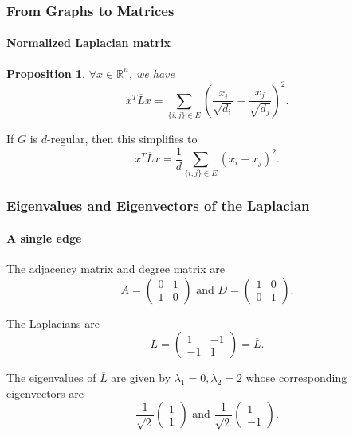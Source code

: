 \documentclass[aspectratio=43,leqno]{beamer}
\newtheorem{proposition}[theorem]{Proposition}
\begin{document}
\begin{frame}
  \frametitle{From Graphs to Matrices}
  \framesubtitle{Normalized Laplacian matrix}

\begin{proposition}
  $\forall x \in \mathbb{R}^n$, we have 
\begin{displaymath}
x^T \overline{L} x = \sum_{\{i,j\}\in E} \left( \frac{x_i}{\sqrt{d_i}} - \frac{x_j}{\sqrt{d_j}} \right)^2.
\end{displaymath} 
\end{proposition}
\pause

If $G$ is $d$-regular, then this simplifies to 
\begin{displaymath}
x^T\overline{L}x = \frac{1}{d} \sum_{\{i,j\}\in E} (x_i-x_j)^2.
\end{displaymath}

\end{frame}

\begin{frame}
  \frametitle{Eigenvalues and Eigenvectors of the Laplacian}
  \framesubtitle{A single edge}

\begin{center}
\end{center}
  The adjacency matrix and degree matrix are
\begin{displaymath}
A = \begin{pmatrix} 0 & 1 \\ 1 & 0 \end{pmatrix} \text{ and } D = \begin{pmatrix} 1 & 0 \\ 0 & 1 \end{pmatrix}.
\end{displaymath}
\pause

The Laplacians are 
\begin{displaymath}
L = \begin{pmatrix} 1 & -1 \\ -1 & 1 \end{pmatrix} = \overline{L}.
\end{displaymath}
\pause

The eigenvalues of $\overline{L}$ are given by $\lambda_1 = 0, \lambda_2 = 2$ whose corresponding eigenvectors are 
\begin{displaymath}
\frac{1}{\sqrt{2}} \begin{pmatrix} 1 \\ 1 \end{pmatrix} \text{ and } \frac{1}{\sqrt{2}} \begin{pmatrix} 1 \\ -1 \end{pmatrix}.
\end{displaymath}

\end{frame}
\end{document}
